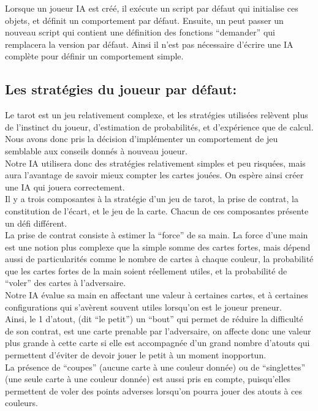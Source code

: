 \documentclass[a4paper]{report}
\begin{document}
			Lorsque un joueur IA est créé, il exécute un script par défaut qui initialise ces objets, et définit un comportement par défaut. Ensuite, un peut passer un nouveau script qui 				contient une définition des fonctions “demander” qui remplacera la version par défaut. Ainsi il n’est pas nécessaire d’écrire une IA complète pour définir un comportement simple.


\subsection{Les stratégies du joueur par défaut:}

Le tarot est un jeu relativement complexe, et les stratégies utilisées relèvent plus de l’instinct du joueur, d’estimation de probabilités, et d’expérience que de calcul. Nous avons donc pris la décision d'implémenter un comportement de jeu semblable aux conseils donnés à nouveau joueur.\\
Notre IA utilisera donc des stratégies relativement simples et peu risquées, mais aura l’avantage de savoir mieux compter les cartes jouées. On espère ainsi créer une IA qui jouera correctement.\\

Il y a trois composantes à la stratégie d’un jeu de tarot, la prise de contrat, la constitution de l’écart, et le jeu de la carte. Chacun de ces composantes présente un défi différent.\\

La prise de contrat consiste à estimer la “force” de sa main. La force d’une main est une notion plus complexe que la simple somme des cartes fortes, mais dépend aussi de particularités comme le nombre de cartes à chaque couleur, la probabilité que les cartes fortes de la main soient réellement utiles, et la probabilité de “voler” des cartes à l’adversaire.\\

Notre IA évalue sa main en affectant une valeur à certaines cartes, et à certaines configurations qui s’avèrent souvent utiles lorsqu’on est le joueur preneur.\\
Ainsi, le 1 d’atout, (dit “le petit”) un “bout” qui permet de réduire la difficulté de son contrat, est une carte prenable par l’adversaire, on affecte donc une valeur plus grande à cette carte si elle est accompagnée d’un grand nombre d’atouts qui permettent d’éviter de devoir jouer le petit à un moment inopportun.\\
La présence de “coupes” (aucune carte à une couleur donnée) ou de “singlettes” (une seule carte à une couleur donnée) est aussi pris en compte, puisqu’elles permettent de voler des points adverses lorsqu’on pourra jouer des atouts à ces couleurs.\\
\end{document}
